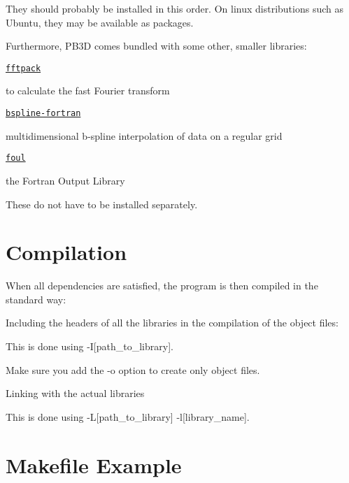 They should probably be installed in this order. On linux distributions such as Ubuntu, they may be available as packages.

Furthermore, P\+B3D comes bundled with some other, smaller libraries\+:
\begin{DoxyItemize}
\item \href{http://www.netlib.org/fftpack/}{\tt fftpack}
\begin{DoxyItemize}
\item to calculate the fast Fourier transform
\end{DoxyItemize}
\item \href{https://github.com/jacobwilliams/bspline-fortran}{\tt bspline-\/fortran}
\begin{DoxyItemize}
\item multidimensional b-\/spline interpolation of data on a regular grid
\end{DoxyItemize}
\item \href{http://foul.sourceforge.net/}{\tt foul}
\begin{DoxyItemize}
\item the Fortran Output Library
\end{DoxyItemize}
\end{DoxyItemize}

These do not have to be installed separately.\hypertarget{page_installation_installation_compilation}{}\section{Compilation}\label{page_installation_installation_compilation}
When all dependencies are satisfied, the program is then compiled in the standard way\+:
\begin{DoxyItemize}
\item Including the headers of all the libraries in the compilation of the object files\+:
\begin{DoxyItemize}
\item This is done using {\ttfamily -\/I\mbox{[}path\+\_\+to\+\_\+library\mbox{]}}.
\item Make sure you add the {\ttfamily -\/o} option to create only object files.
\end{DoxyItemize}
\item Linking with the actual libraries
\begin{DoxyItemize}
\item This is done using {\ttfamily -\/L\mbox{[}path\+\_\+to\+\_\+library\mbox{]} -\/l\mbox{[}library\+\_\+name\mbox{]}}.
\end{DoxyItemize}
\end{DoxyItemize}\hypertarget{page_installation_installation_makefile}{}\section{Makefile Example}\label{page_installation_installation_makefile}

